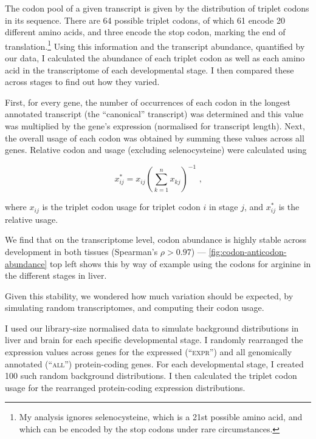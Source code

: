 The codon pool of a given \mrna transcript is given by the distribution of
triplet codons in its sequence. There are 64 possible triplet codons, of which
61 encode 20 different amino acids, and three encode the stop codon, marking the
end of translation.\footnote{My analysis ignores selenocysteine, which is a
\num{21}st possible amino acid, and which can be encoded by the stop codons
 under rare circumstances.} Using this information and the transcript
abundance, quantified by our \rnaseq data, I calculated the abundance of each
triplet codon as well as each amino acid in the transcriptome of each
developmental stage. I then compared these across stages to find out how they
varied.

First, for every gene, the number of occurrences of each codon in the longest
annotated transcript (the “canonical” transcript) was determined and this value
was multiplied by the gene’s expression (normalised for transcript length).
Next, the overall usage of each codon was obtained by summing these values
across all genes. Relative codon and usage (excluding selenocysteine) were
calculated using

\begin{equation}
    x_{ij}^* = x_{ij}\left(\sum_{k=1}^n x_{kj}\right)^{-1} \text{\ ,}
\end{equation}

where \(x_{ij}\) is the triplet codon usage for triplet codon \(i\) in stage
\(j\), and \(x_{ij}^*\) is the relative usage.

We find that on the transcriptome level, codon abundance is highly stable across
development in both tissues (Spearman’s \(\rho > 0.97\)) ---
\cref{fig:codon-anticodon-abundance} top left shows this by way of example using
the codons for arginine in the different stages in liver.

Given this stability, we wondered how much variation should be expected, by
simulating random transcriptomes, and computing their codon usage.

I used our library-size normalised \rnaseq data to simulate background
distributions in liver and brain for each specific developmental stage. I
randomly rearranged the expression values across genes for the expressed
(“\textsc{expr}”) and all genomically annotated (“\textsc{all}”) protein-coding
genes. For each developmental stage, I created \num{100} such random background
distributions. I then calculated the triplet codon usage for the rearranged
protein-coding \rna expression distributions.

